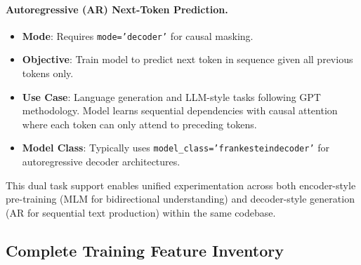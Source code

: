 \documentclass[11pt,a4paper]{article}
\begin{document}
\paragraph{Autoregressive (AR) Next-Token Prediction.}
\begin{itemize}[leftmargin=*]
    \item \textbf{Mode}: Requires \texttt{mode='decoder'} for causal masking.
    \item \textbf{Objective}: Train model to predict next token in sequence given all previous tokens only.
    \item \textbf{Use Case}: Language generation and LLM-style tasks following GPT methodology. Model learns sequential dependencies with causal attention where each token can only attend to preceding tokens.
    \item \textbf{Model Class}: Typically uses \texttt{model\_class='frankesteindecoder'} for autoregressive decoder architectures.
\end{itemize}

This dual task support enables unified experimentation across both encoder-style pre-training (MLM for bidirectional understanding) and decoder-style generation (AR for sequential text production) within the same codebase.

\subsection{Complete Training Feature Inventory}
\end{document}
